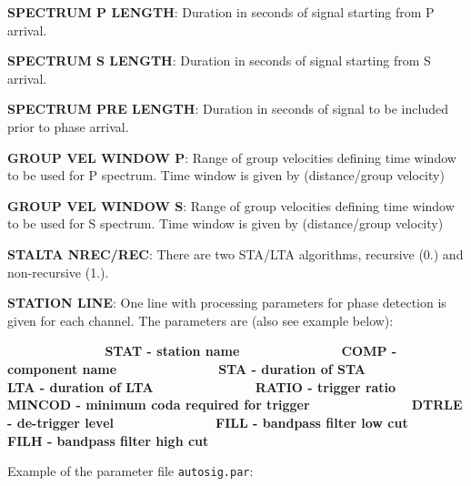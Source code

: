 \textbf{SPECTRUM P LENGTH}: Duration in seconds of signal starting from P arrival. 

\textbf{SPECTRUM S LENGTH}: Duration in seconds of signal starting from S arrival. 

\textbf{SPECTRUM PRE LENGTH}: Duration in seconds of signal to be included prior to phase arrival. 

\textbf{GROUP VEL WINDOW P}: Range of group velocities defining time window to be used for P spectrum. 
Time window is given by (distance/group velocity) 

\textbf{GROUP VEL WINDOW S}: Range of group velocities defining time window to be used for S spectrum. Time window is given by (distance/group velocity) 

\textbf{STALTA NREC/REC}: There are two STA/LTA algorithms, recursive (0.) and non-recursive (1.). 

\textbf{STATION LINE}: One line with processing parameters for phase detection is given for each channel. The parameters are (also see example below): 

\verb|               |\textbf{STAT - station name}\newline
\verb|               |\textbf{COMP - component name}\newline
\verb|               |\textbf{STA - duration of STA}\newline
\verb|               |\textbf{LTA - duration of LTA}\newline
\verb|               |\textbf{RATIO - trigger ratio}\newline
\verb|               |\textbf{MINCOD - minimum coda required for trigger}\newline
\verb|               |\textbf{DTRLE - de-trigger level}\newline
\verb|               |\textbf{FILL - bandpass filter low cut}\newline
\verb|               |\textbf{FILH - bandpass filter high cut}

Example of the parameter file \texttt{autosig.par}: 



